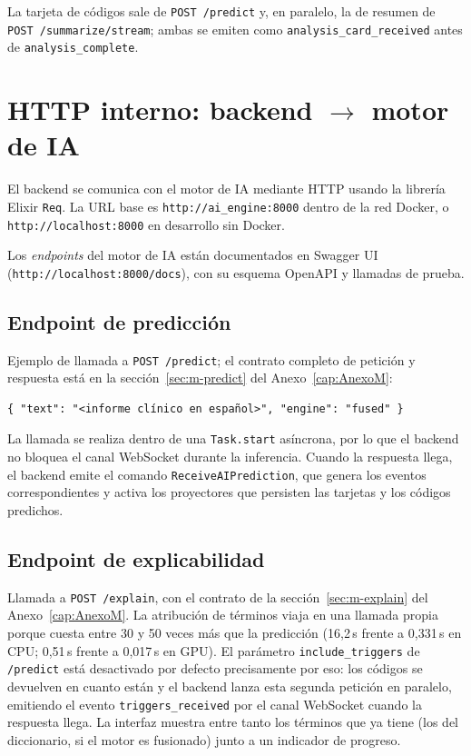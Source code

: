 La tarjeta de códigos sale de \texttt{POST /predict} y, en paralelo, la de resumen de \texttt{POST /summarize/stream}; ambas se emiten como \texttt{analysis\_card\_received} antes de \texttt{analysis\_complete}.

\section{HTTP interno: backend \texorpdfstring{$\rightarrow$}{->} motor de IA}

El backend se comunica con el motor de IA mediante HTTP usando la librería Elixir \texttt{Req}. La URL base es \texttt{http://ai\_engine:8000} dentro de la red Docker, o \texttt{http://localhost:8000} en desarrollo sin Docker.

Los \emph{endpoints} del motor de IA están documentados en Swagger UI (\texttt{http://localhost:\allowbreak{}8000/docs}), con su esquema OpenAPI y llamadas de prueba.

\subsection{Endpoint de predicción}

Ejemplo de llamada a \texttt{POST /predict}; el contrato completo de petición y respuesta está en la sección~\ref{sec:m-predict} del Anexo~\ref{cap:AnexoM}:

\begin{verbatim}
{ "text": "<informe clínico en español>", "engine": "fused" }
\end{verbatim}

La llamada se realiza dentro de una \texttt{Task.start} asíncrona, por lo que el backend no bloquea el canal WebSocket durante la inferencia. Cuando la respuesta llega, el backend emite el comando \texttt{ReceiveAIPrediction}, que genera los eventos correspondientes y activa los proyectores que persisten las tarjetas y los códigos predichos.

\subsection{Endpoint de explicabilidad}

Llamada a \texttt{POST /explain}, con el contrato de la sección~\ref{sec:m-explain} del Anexo~\ref{cap:AnexoM}. La atribución de términos viaja en una llamada propia porque cuesta entre 30 y 50 veces más que la predicción (16,2\,s frente a 0,331\,s en CPU; 0,51\,s frente a 0,017\,s en GPU). El parámetro \texttt{include\_triggers} de \texttt{/predict} está desactivado por defecto precisamente por eso: los códigos se devuelven en cuanto están y el backend lanza esta segunda petición en paralelo, emitiendo el evento \texttt{triggers\_received} por el canal WebSocket cuando la respuesta llega. La interfaz muestra entre tanto los términos que ya tiene (los del diccionario, si el motor es fusionado) junto a un indicador de progreso.

